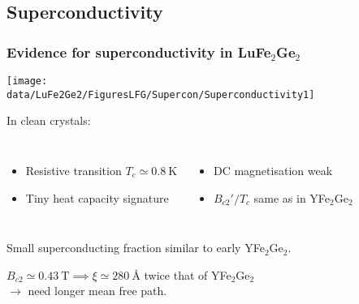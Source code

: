 \subsection{Superconductivity}
\begin{frame}[label=LFGSupercon]
\frametitle{Evidence for superconductivity in LuFe$_2$Ge$_2$}
\centerline{\texttt{[image: \\data/LuFe2Ge2/FiguresLFG/Supercon/Superconductivity1]}}

In clean crystals:
\begin{columns}[t]
\begin{itemize}
\item Resistive transition $T_c \simeq \SI{0.8}{\kelvin}$
\item Tiny heat capacity signature
\end{itemize}
\begin{itemize}
\item DC magnetisation weak
\item $B_{c2}'/T_c$ same as in YFe$_2$Ge$_2$
\end{itemize}
\end{columns}

\begin{center}
{Small superconducting fraction similar to early YFe$_2$Ge$_2$.} \\
\end{center}

$B_{c2} \simeq \SI{0.43}{\tesla} \implies \xi \simeq \SI{280}{\angstrom}$ twice that of YFe$_2$Ge$_2$ \\
\raggedleft $\rightarrow$ need longer mean free path. 
\end{frame}





